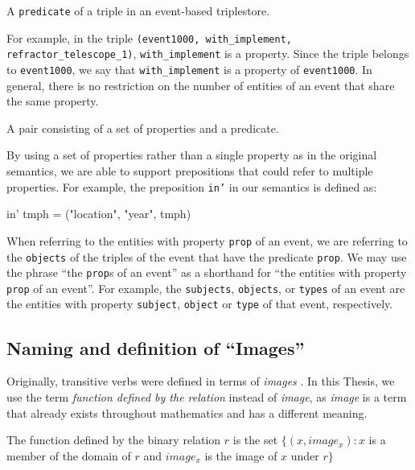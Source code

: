 \documentclass[../main.tex]{subfiles}
\begin{document}
\begin{definition}[Property]
	A \texttt{predicate} of a triple in an event-based triplestore.
\end{definition}

For example, in the triple \texttt{(event1000, with\_implement, refractor\_telescope\_1)}, \texttt{with\_implement} is a property.  Since the triple belongs to \texttt{event1000}, we say that \texttt{with\_implement} is a property of \texttt{event1000}.  In general, there is no restriction on the number of entities of an event that share the same property.

\begin{definition}[Preposition]
	A pair consisting of a set of properties and a predicate.
\end{definition}

By using a set of properties rather than a single property as in the original semantics, we are able to support prepositions that could refer to multiple properties.
For example, the preposition \texttt{in'} in our semantics is defined as:

\begin{code}
	in' tmph = ({"location", "year"}, tmph)
\end{code}

When referring to the entities with property \texttt{prop} of an event, we are referring to the \texttt{objects} of the triples of the event that have the predicate \texttt{prop}.
We may use the phrase ``the \texttt{prop}s of an event'' as a shorthand for ``the entities with property \texttt{prop} of an event''.
For example, the \texttt{subjects}, \texttt{objects}, or \texttt{types} of an event are the entities with property \texttt{subject}, \texttt{object} or \texttt{type} of that event, respectively.

\subsection{Naming and definition of ``Images''}

Originally, transitive verbs were defined in terms of {\em images} \cite{frost2014denotational}.
In this Thesis, we use the term {\em function defined by the relation} instead of {\em image}, as {\em image} is a term that already exists throughout mathematics and has
a different meaning.

\begin{definition}
	The function defined by the binary relation $r$ is the set $\{(x, image_x) : x $ is a member of the domain of $r$ and $image_x$ is the image of $x$ under $r\}$
\end{definition}
\end{document}
